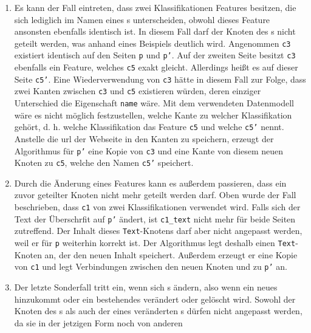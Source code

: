     \begin{enumerate}
        \item Es kann der Fall eintreten, dass zwei Klassifikationen Features besitzen,
        die sich lediglich im Namen eines {\childFeature}s unterscheiden,
        obwohl dieses Feature ansonsten ebenfalls identisch ist.
        In diesem Fall darf der Knoten des {\parentFeature}s nicht geteilt werden,
        was anhand eines Beispiels deutlich wird.
        Angenommen \texttt{c3} existiert identisch auf den Seiten \texttt{p} und \texttt{p'}.
        Auf der zweiten Seite besitzt \texttt{c3} ebenfalls ein Feature,
        welches \texttt{c5} exakt gleicht.
        Allerdings heißt es auf dieser Seite \texttt{c5'}.
        Eine Wiederverwendung von \texttt{c3} hätte in diesem Fall zur Folge,
        dass zwei Kanten zwischen \texttt{c3} und \texttt{c5} existieren würden,
        deren einziger Unterschied die Eigenschaft \texttt{name} wäre.
        Mit dem verwendeten Datenmodell wäre es nicht möglich festzustellen,
        welche Kante zu welcher Klassifikation gehört,
        d. h. welche Klassifikation das Feature \texttt{c5} und welche \texttt{c5'} nennt.
        Anstelle die \gls{url} der Webseite in den Kanten zu speichern,
        erzeugt der Algorithmus für \texttt{p'} eine Kopie von \texttt{c3}
        und eine Kante von diesem neuen Knoten zu \texttt{c5},
        welche den Namen \texttt{c5'} speichert.
        \item Durch die Änderung eines Features kann es außerdem passieren,
        dass ein zuvor geteilter Knoten nicht mehr geteilt werden darf.
        Oben wurde der Fall beschrieben, dass \texttt{c1}
        von zwei Klassifikationen verwendet wird.
        Falls sich der Text der Überschrfit auf \texttt{p'} ändert,
        ist \texttt{c1\_text} nicht mehr für beide Seiten zutreffend.
        Der Inhalt dieses \texttt{Text}-Knotens darf aber nicht angepasst werden,
        weil er für \texttt{p} weiterhin korrekt ist.
        Der Algorithmus legt deshalb einen \texttt{Text}-Knoten an,
        der den neuen Inhalt speichert.
        Außerdem erzeugt er eine Kopie von \texttt{c1}
        und legt Verbindungen zwischen den neuen Knoten und zu \texttt{p'} an.
        \item Der letzte Sonderfall tritt ein, wenn sich {\childFeature}s ändern,
        also wenn ein neues hinzukommt oder ein bestehendes verändert oder gelöscht wird.
        Sowohl der Knoten des {\parentFeature}s als auch der eines veränderten {\childFeature}s
        dürfen nicht angepasst werden, da sie in der jetzigen Form noch von anderen

\end{enumerate}
